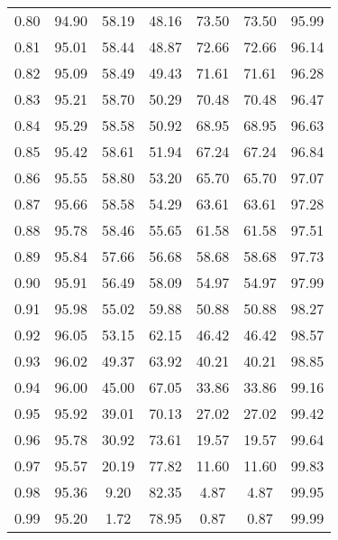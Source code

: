 \begin{tabular}{|c|c|c|c|c|c|c|}
      0.80 &     94.90 &     58.19 &      48.16 &   73.50 &      73.50 &         95.99 \\
      0.81 &     95.01 &     58.44 &      48.87 &   72.66 &      72.66 &         96.14 \\
      0.82 &     95.09 &     58.49 &      49.43 &   71.61 &      71.61 &         96.28 \\
      0.83 &     95.21 &     58.70 &      50.29 &   70.48 &      70.48 &         96.47 \\
      0.84 &     95.29 &     58.58 &      50.92 &   68.95 &      68.95 &         96.63 \\
      0.85 &     95.42 &     58.61 &      51.94 &   67.24 &      67.24 &         96.84 \\
      0.86 &     95.55 &     58.80 &      53.20 &   65.70 &      65.70 &         97.07 \\
      0.87 &     95.66 &     58.58 &      54.29 &   63.61 &      63.61 &         97.28 \\
      0.88 &     95.78 &     58.46 &      55.65 &   61.58 &      61.58 &         97.51 \\
      0.89 &     95.84 &     57.66 &      56.68 &   58.68 &      58.68 &         97.73 \\
      0.90 &     95.91 &     56.49 &      58.09 &   54.97 &      54.97 &         97.99 \\
      0.91 &     95.98 &     55.02 &      59.88 &   50.88 &      50.88 &         98.27 \\
      0.92 &     96.05 &     53.15 &      62.15 &   46.42 &      46.42 &         98.57 \\
      0.93 &     96.02 &     49.37 &      63.92 &   40.21 &      40.21 &         98.85 \\
      0.94 &     96.00 &     45.00 &      67.05 &   33.86 &      33.86 &         99.16 \\
      0.95 &     95.92 &     39.01 &      70.13 &   27.02 &      27.02 &         99.42 \\
      0.96 &     95.78 &     30.92 &      73.61 &   19.57 &      19.57 &         99.64 \\
      0.97 &     95.57 &     20.19 &      77.82 &   11.60 &      11.60 &         99.83 \\
      0.98 &     95.36 &      9.20 &      82.35 &    4.87 &       4.87 &         99.95 \\
      0.99 &     95.20 &      1.72 &      78.95 &    0.87 &       0.87 &         99.99 \\
\bottomrule
\end{tabular}
